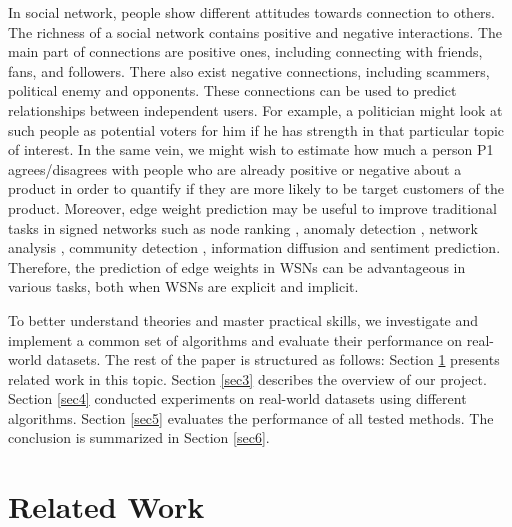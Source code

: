 \documentclass{article}
\begin{document}
In social network, people show different attitudes towards 
connection to others. The richness of a social network contains 
positive and negative interactions. The main part of connections 
are positive ones, including connecting with friends, fans, and
followers. There also exist negative connections, including 
scammers, political enemy and opponents. These connections can 
be used to predict relationships between independent users. 
For example, a politician might look at such people as potential 
voters for him if he has strength in that particular topic of 
interest. In the same vein, we might wish to estimate how much 
a person P1 agrees/disagrees with people who are already 
positive or negative about a product in order to quantify if 
they are more likely to be target customers of the product. 
Moreover, edge weight prediction may be useful to improve 
traditional tasks in signed networks such as node ranking
\cite{shahriari2014ranking}, anomaly detection\cite{Kmumar2014}
\cite{Wu:2016:TMR:2835776.2835816}, network 
analysis\cite{Kumar:2016:SDS:2872518.2889391}
\cite{leskovec2010signed}, community detection
\cite{PhysRevE.80.036115}, information diffusion
\cite{Shafaei_2014} \cite{Li2014} and sentiment 
prediction\cite{west2014}. Therefore, the prediction of edge 
weights in WSNs can be advantageous in various tasks, both 
when WSNs are explicit and implicit.

To better understand theories and master practical skills, we investigate and implement a common set of algorithms and evaluate their performance on real-world datasets. The rest of the paper is structured as follows: Section \ref{sec2} presents related work in this topic. Section \ref{sec3} describes the overview of our project. Section \ref{sec4} conducted experiments on real-world datasets using different algorithms. Section \ref{sec5} evaluates the performance of all tested methods. The conclusion is summarized in Section \ref{sec6}.

\section{Related Work}
\label{sec2}
\end{document}
